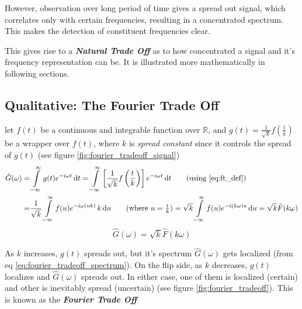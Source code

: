 \documentclass[11pt, a4paper]{article}
\newcommand{\quotedsingle}[1]{#1}	%
\newcommand{\quotedsingleit}[1]{\quotedsingle{\textit{#1}}}	%
\newcommand{\eqrefnp}[1]{\textup{\ref{#1}}}  %
\newcommand{\diff}{\mathop{}\!\mathrm{d}}
\newcommand{\du}{\diff u}
\newcommand{\dt}{\diff t}
\newcommand{\dint}[2]{\int \limits_{#1}^{#2}}  %
\newcommand{\intinfty}{\dint{-\infty}{\infty}}	%
\begin{document}
	However, observation over long period of time gives a spread out signal, which correlates only with certain frequencies, resulting in a concentrated spectrum. This makes the detection of constituent frequencies clear.
	
	This gives rise to a \quotedsingleit{\textbf{Natural Trade Off}} as to how concentrated a signal and it's frequency representation can be. It is illustrated more mathematically in following sections.
	
	\subsection{Qualitative: The Fourier Trade Off}\label{sec:fourier_uncertainity_principle_qualitative}
	let $f(t)$ be a continuous and integrable function over $\mathbb{R}$, and $g(t) = \frac{1}{\sqrt{k}} f \left( \frac{t}{k} \right)$ be a wrapper over $f(t)$, where $k$ is \quotedsingleit{spread constant} since it controls the spread of $g(t)$ (see figure \ref{fig:fourier_tradeoff_signal}) \cite{dubey2021fourieruncertainity}
	\begin{align*}
		\hat{G}(\omega) = & \intinfty g(t) e^{-i \omega t} \dt
		= \intinfty \left[ \frac{1}{\sqrt{k}} f \left( \frac{t}{k} \right) \right] e^{-i \omega t} \dt  \tag{using \eqrefnp{eq:ft_def}} \\
		= & \frac{1}{\sqrt{k}} \intinfty f(u) e^{-i \omega (uk)} \, k \du  \tag{where $u = \frac{t}{k}$} 
		= \sqrt{k} \intinfty f(u) e^{-i (k \omega) u} \du = \sqrt{k} \hat{F}(k \omega) 
	\end{align*}
	\begin{equation}\label{eq:fourier_tradeoff_spectrum}
		\boxed{
			\hat{G}(\omega) = \sqrt{k} \hat{F}(k \omega)
		}
	\end{equation}
	
	As $k$ increases, $g(t)$ spreads out, but it's spectrum $\hat{G}(\omega)$ gets localized (from eq \eqrefnp{eq:fourier_tradeoff_spectrum}). On the flip side, as $k$ decreases, $g(t)$ localizes and $\hat{G}(\omega)$ spreads out. In either case, one of them is localized (certain) and other is inevitably spread (uncertain) (see figure \ref{fig:fourier_tradeoff}). This is known as the \textbf{\textit{Fourier Trade Off}}
	
\end{document}
